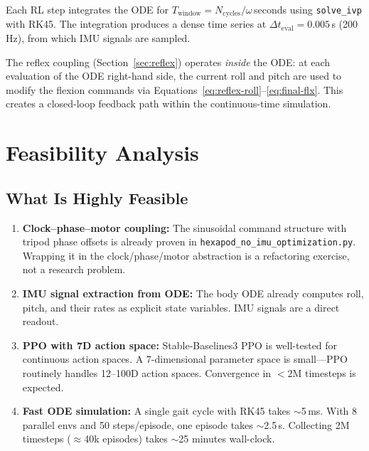 \documentclass[11pt]{article}
\begin{document}
Each RL step integrates the ODE for $T_{\mathrm{window}} = N_{\mathrm{cycles}} / \omega$\,seconds using \texttt{solve\_ivp} with RK45. The integration produces a dense time series at $\Delta t_{\mathrm{eval}} = 0.005$\,s (200\,Hz), from which IMU signals are sampled.

The reflex coupling (Section~\ref{sec:reflex}) operates \emph{inside} the ODE: at each evaluation of the ODE right-hand side, the current roll and pitch are used to modify the flexion commands via Equations~\eqref{eq:reflex-roll}--\eqref{eq:final-flx}. This creates a closed-loop feedback path within the continuous-time simulation.

\section{Feasibility Analysis}
\label{sec:feasibility}

\subsection{What Is Highly Feasible}

\begin{enumerate}
    \item \textbf{Clock--phase--motor coupling:} The sinusoidal command structure with tripod phase offsets is already proven in \texttt{hexapod\_no\_imu\_optimization.py}. Wrapping it in the clock/phase/motor abstraction is a refactoring exercise, not a research problem.
    
    \item \textbf{IMU signal extraction from ODE:} The body ODE already computes roll, pitch, and their rates as explicit state variables. IMU signals are a direct readout.
    
    \item \textbf{PPO with 7D action space:} Stable-Baselines3 PPO is well-tested for continuous action spaces. A 7-dimensional parameter space is small---PPO routinely handles 12--100D action spaces. Convergence in $<$2M timesteps is expected.
    
    \item \textbf{Fast ODE simulation:} A single gait cycle with RK45 takes $\sim$5\,ms. With 8 parallel envs and 50 steps/episode, one episode takes $\sim$2.5\,s. Collecting 2M timesteps ($\approx$40k episodes) takes $\sim$25 minutes wall-clock.
\end{enumerate}
\end{document}
